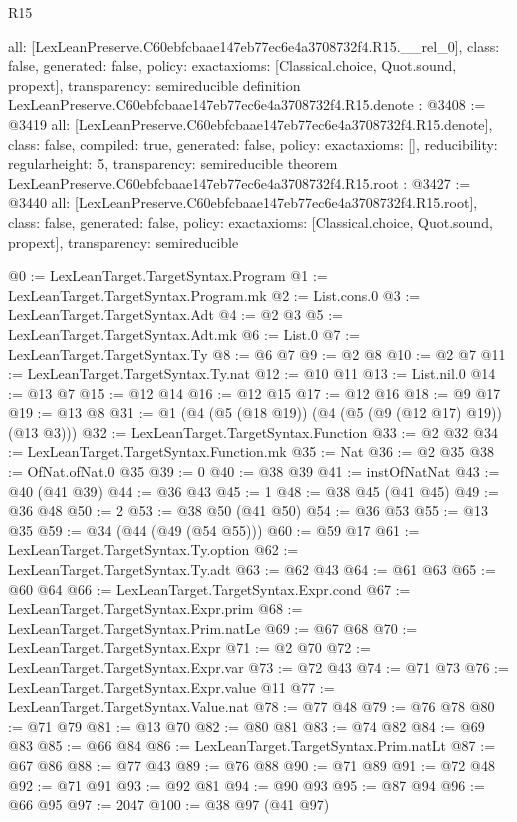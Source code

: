 \begin{lexlean}{R15}
\begin{coremodule}
{  all: [LexLeanPreserve.C60ebfcbaae147eb77ec6e4a3708732f4.R15.__rel_0],
  class: false,
  generated: false,
  policy: exact{axioms: [Classical.choice, Quot.sound, propext]},
  transparency: semireducible
}
definition LexLeanPreserve.C60ebfcbaae147eb77ec6e4a3708732f4.R15.denote : @3408 := @3419 {
  all: [LexLeanPreserve.C60ebfcbaae147eb77ec6e4a3708732f4.R15.denote],
  class: false,
  compiled: true,
  generated: false,
  policy: exact{axioms: []},
  reducibility: regular{height: 5},
  transparency: semireducible
}
theorem LexLeanPreserve.C60ebfcbaae147eb77ec6e4a3708732f4.R15.root : @3427 := @3440 {
  all: [LexLeanPreserve.C60ebfcbaae147eb77ec6e4a3708732f4.R15.root],
  class: false,
  generated: false,
  policy: exact{axioms: [Classical.choice, Quot.sound, propext]},
  transparency: semireducible
}

@0 := LexLeanTarget.TargetSyntax.Program
@1 := LexLeanTarget.TargetSyntax.Program.mk
@2 := List.cons.{0}
@3 := LexLeanTarget.TargetSyntax.Adt
@4 := @2 @3
@5 := LexLeanTarget.TargetSyntax.Adt.mk
@6 := List.{0}
@7 := LexLeanTarget.TargetSyntax.Ty
@8 := @6 @7
@9 := @2 @8
@10 := @2 @7
@11 := LexLeanTarget.TargetSyntax.Ty.nat
@12 := @10 @11
@13 := List.nil.{0}
@14 := @13 @7
@15 := @12 @14
@16 := @12 @15
@17 := @12 @16
@18 := @9 @17
@19 := @13 @8
@31 := @1 (@4 (@5 (@18 @19)) (@4 (@5 (@9 (@12 @17) @19)) (@13 @3)))
@32 := LexLeanTarget.TargetSyntax.Function
@33 := @2 @32
@34 := LexLeanTarget.TargetSyntax.Function.mk
@35 := Nat
@36 := @2 @35
@38 := OfNat.ofNat.{0} @35
@39 := 0
@40 := @38 @39
@41 := instOfNatNat
@43 := @40 (@41 @39)
@44 := @36 @43
@45 := 1
@48 := @38 @45 (@41 @45)
@49 := @36 @48
@50 := 2
@53 := @38 @50 (@41 @50)
@54 := @36 @53
@55 := @13 @35
@59 := @34 (@44 (@49 (@54 @55)))
@60 := @59 @17
@61 := LexLeanTarget.TargetSyntax.Ty.option
@62 := LexLeanTarget.TargetSyntax.Ty.adt
@63 := @62 @43
@64 := @61 @63
@65 := @60 @64
@66 := LexLeanTarget.TargetSyntax.Expr.cond
@67 := LexLeanTarget.TargetSyntax.Expr.prim
@68 := LexLeanTarget.TargetSyntax.Prim.natLe
@69 := @67 @68
@70 := LexLeanTarget.TargetSyntax.Expr
@71 := @2 @70
@72 := LexLeanTarget.TargetSyntax.Expr.var
@73 := @72 @43
@74 := @71 @73
@76 := LexLeanTarget.TargetSyntax.Expr.value @11
@77 := LexLeanTarget.TargetSyntax.Value.nat
@78 := @77 @48
@79 := @76 @78
@80 := @71 @79
@81 := @13 @70
@82 := @80 @81
@83 := @74 @82
@84 := @69 @83
@85 := @66 @84
@86 := LexLeanTarget.TargetSyntax.Prim.natLt
@87 := @67 @86
@88 := @77 @43
@89 := @76 @88
@90 := @71 @89
@91 := @72 @48
@92 := @71 @91
@93 := @92 @81
@94 := @90 @93
@95 := @87 @94
@96 := @66 @95
@97 := 2047
@100 := @38 @97 (@41 @97)

\end{coremodule}
\end{lexlean}
